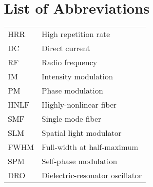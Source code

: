  \chapter*{List of Abbreviations}
 \label{ch:abbreviations}
 



\begin{longtable}{l l}
	HRR & High repetition rate \\
	DC & Direct current \\
	RF & Radio frequency \\
	IM & Intensity modulation \\
	PM & Phase modulation \\
	HNLF & Highly-nonlinear fiber \\
	SMF & Single-mode fiber \\
	SLM & Spatial light modulator \\
	FWHM & Full-width at half-maximum \\
	SPM & Self-phase modulation \\
	DRO & Dielectric-resonator oscillator \\

\end{longtable}
